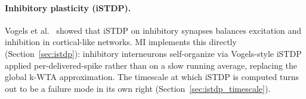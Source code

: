 \paragraph{Inhibitory plasticity (iSTDP).}
Vogels et al.\ \cite{vogels2011inhibitory} showed that iSTDP on inhibitory synapses balances excitation and inhibition in cortical-like networks. MI implements this directly (Section~\ref{sec:istdp}): inhibitory interneurons self-organize via Vogels-style iSTDP applied per-delivered-spike rather than on a slow running average, replacing the global k-WTA approximation. The timescale at which iSTDP is computed turns out to be a failure mode in its own right (Section~\ref{sec:istdp_timescale}).

